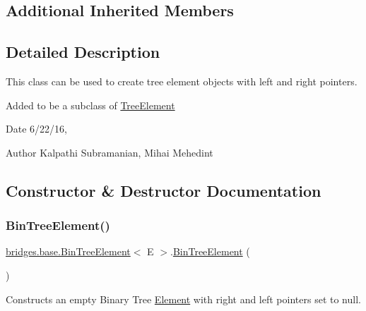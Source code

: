 \subsection*{Additional Inherited Members}


\subsection{Detailed Description}
This class can be used to create tree element objects with left and right pointers. 

Added to be a subclass of \hyperlink{classbridges_1_1base_1_1_tree_element}{Tree\+Element}

\begin{DoxyDate}{Date}
6/22/16, 
\end{DoxyDate}
\begin{DoxyAuthor}{Author}
Kalpathi Subramanian, Mihai Mehedint 
\end{DoxyAuthor}


\subsection{Constructor \& Destructor Documentation}
\hypertarget{classbridges_1_1base_1_1_bin_tree_element_ad6dbf38d53a78be561039c46bde8bc47}{}\label{classbridges_1_1base_1_1_bin_tree_element_ad6dbf38d53a78be561039c46bde8bc47} 
\subsubsection{\texorpdfstring{Bin\+Tree\+Element()}{BinTreeElement()}\hspace{0.1cm}{\footnotesize\ttfamily [1/5]}}
{\footnotesize\ttfamily \hyperlink{classbridges_1_1base_1_1_bin_tree_element}{bridges.\+base.\+Bin\+Tree\+Element}$<$ E $>$.\hyperlink{classbridges_1_1base_1_1_bin_tree_element}{Bin\+Tree\+Element} (\begin{DoxyParamCaption}{ }\end{DoxyParamCaption})}

Constructs an empty Binary Tree \hyperlink{classbridges_1_1base_1_1_element}{Element} with right and left pointers set to null. \hypertarget{classbridges_1_1base_1_1_bin_tree_element_a2d31fa068f962ced8702fdb4b36c9186}{}\label{classbridges_1_1base_1_1_bin_tree_element_a2d31fa068f962ced8702fdb4b36c9186} 
